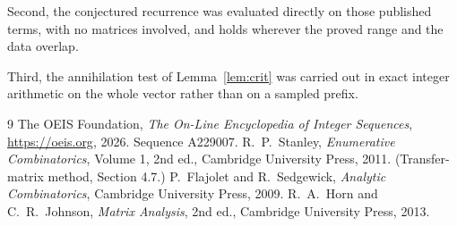 \documentclass[11pt,a4paper]{article}
\theoremstyle{plain}
\theoremstyle{definition}
\begin{document}
Second, the conjectured recurrence was evaluated directly on those published terms, with no
matrices involved, and holds wherever the proved range and the data overlap.

Third, the annihilation test of Lemma~\ref{lem:crit} was carried out in exact integer
arithmetic on the whole vector rather than on a sampled prefix.

\begin{thebibliography}{9}
 The OEIS Foundation, \emph{The On-Line Encyclopedia of Integer
Sequences}, \url{https://oeis.org}, 2026. Sequence A229007.
 R.~P.~Stanley, \emph{Enumerative Combinatorics}, Volume 1, 2nd ed.,
Cambridge University Press, 2011. (Transfer-matrix method, Section 4.7.)
 P.~Flajolet and R.~Sedgewick, \emph{Analytic Combinatorics}, Cambridge
University Press, 2009.
 R.~A.~Horn and C.~R.~Johnson, \emph{Matrix Analysis}, 2nd ed., Cambridge
University Press, 2013.
\end{thebibliography}
\end{document}
